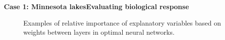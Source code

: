 \documentclass[serif]{beamer}\usepackage[]{graphicx}\usepackage[]{color}
\begin{document}
\begin{frame}{\textbf{Case 1: Minnesota lakes}}{\textbf{Evaluating biological response}}
\begin{center}
\begin{figure}[p]
\vspace{0.1in}
\caption{Examples of relative importance of explanatory variables based on weights between layers in optimal neural networks.}  
\end{figure}
\end{center}
\end{frame}
\end{document}
